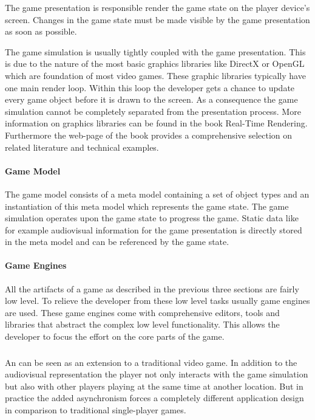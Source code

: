 The game presentation is responsible render the game state on the player
device's screen. Changes in the game state must be made visible by the game
presentation as soon as possible.

The game simulation is usually tightly coupled with the game presentation. This
is due to the nature of the most basic graphics libraries like DirectX or OpenGL
which are foundation of most video games. These graphic libraries typically have
one main render loop. Within this loop the developer gets a chance to update
every game object before it is drawn to the screen. As a consequence the game
simulation cannot be completely separated from the presentation process. More
information on graphics libraries can be found in the book Real-Time
Rendering\cite{RTR3}. Furthermore the web-page of the book provides a
comprehensive selection on related literature and technical examples.

\paragraph{Game Model}

The game model consists of a meta model containing a set of object types and an
instantiation of this meta model which represents the game state. The game
simulation operates upon the game state to progress the game. Static data
like for example audiovisual information for the game presentation is directly
stored in the meta model and can be referenced by the game state.

\paragraph{Game Engines}
All the artifacts of a game as described in the previous three sections are
fairly low level. To relieve the developer from these low level tasks usually
game engines are used. These game engines come with comprehensive editors, tools
and libraries that abstract the complex low level functionality. This allows the
developer to focus the effort on the core parts of the game. 

\subsubsection{\ogs{}}
An \og{} can be seen as an extension to a traditional video game. In addition to
the audiovisual representation the player not only interacts with the game
simulation but also with other players playing at the same time at another
location. But in practice the added asynchronism forces a completely different
application design in comparison to traditional single-player games.

